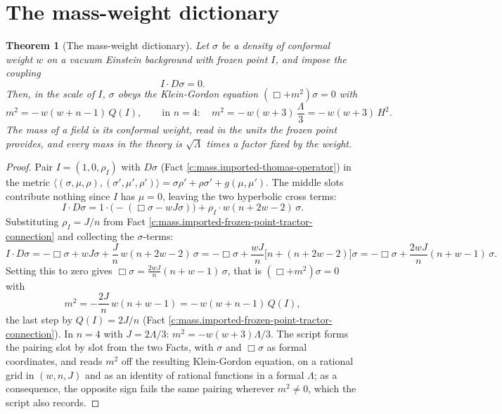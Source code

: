\documentclass[11pt]{article}
\newtheorem{theorem}{Theorem}[section]
\theoremstyle{definition}
\theoremstyle{plain}
\newcommand{\changedmark}[2]{\marginpar{\raggedright\scriptsize\color{#1}#2}}
\providecommand{\ip}{}\renewcommand{\ip}[2]{\langle #1, #2\rangle}
\begin{document}
\section{The mass-weight dictionary}

\begin{theorem}[The mass-weight dictionary]\label{c:mass.mass-weight-dictionary}
\changedmark{gray}{reworded}
Let $\sigma$ be a density of conformal weight $w$ on a vacuum Einstein background with frozen point $I$, and impose the coupling
\[
I \cdot D\sigma = 0.
\]
Then, in the scale of $I$, $\sigma$ obeys the Klein-Gordon equation $(\Box + m^{2})\sigma = 0$ with
\begin{equation}
m^{2} = -\,w(w+n-1)\,Q(I), \qquad\text{in } n = 4:\quad m^{2} = -\,w(w+3)\,\frac{\Lambda}{3} = -\,w(w+3)\,H^{2}.
\end{equation}
The mass of a field is its conformal weight, read in the units the frozen point provides, and every mass in the theory is $\sqrt{\Lambda}$ times a factor fixed by the weight.
\end{theorem}
\begin{proof}
Pair $I = (1, 0, \rho_{I})$ with $D\sigma$ (Fact \ref{c:mass.imported-thomas-operator}) in the metric $\ip{(\sigma,\mu,\rho)}{(\sigma',\mu',\rho')} = \sigma\rho' + \rho\sigma' + g(\mu,\mu')$. The middle slots contribute nothing since $I$ has $\mu = 0$, leaving the two hyperbolic cross terms:
\[
I \cdot D\sigma = 1 \cdot \bigl(-(\Box\sigma - wJ\sigma)\bigr) + \rho_{I} \cdot w(n+2w-2)\,\sigma .
\]
Substituting $\rho_{I} = J/n$ from Fact \ref{c:mass.imported-frozen-point-tractor-connection} and collecting the $\sigma$-terms:
\[
I \cdot D\sigma = -\Box\sigma + wJ\sigma + \frac{J}{n}\,w(n+2w-2)\,\sigma
= -\Box\sigma + \frac{wJ}{n}\bigl[n + (n+2w-2)\bigr]\sigma
= -\Box\sigma + \frac{2wJ}{n}(n+w-1)\,\sigma .
\]
Setting this to zero gives $\Box\sigma = \tfrac{2wJ}{n}(n+w-1)\,\sigma$, that is $(\Box + m^{2})\sigma = 0$ with
\[
m^{2} = -\frac{2J}{n}\,w(n+w-1) = -\,w(w+n-1)\,Q(I),
\]
the last step by $Q(I) = 2J/n$ (Fact \ref{c:mass.imported-frozen-point-tractor-connection}). In $n = 4$ with $J = 2\Lambda/3$: $m^{2} = -w(w+3)\Lambda/3$. The script forms the pairing slot by slot from the two Facts, with $\sigma$ and $\Box\sigma$ as formal coordinates, and reads $m^{2}$ off the resulting Klein-Gordon equation, on a rational grid in $(w, n, J)$ and as an identity of rational functions in a formal $\Lambda$; as a consequence, the opposite sign fails the same pairing wherever $m^{2} \neq 0$, which the script also records.

\end{proof}
\end{document}
